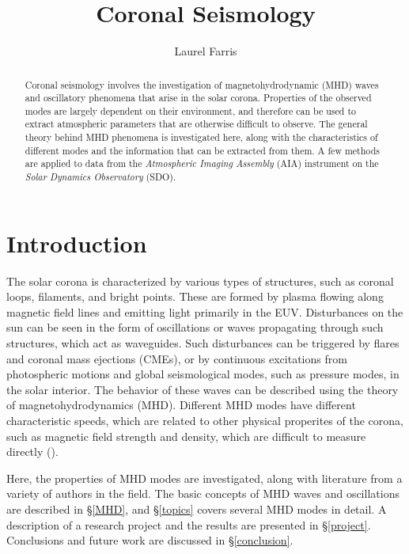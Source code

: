 \documentclass[preprint2]{aastex}
\begin{document}
\title{\vspace{-0.75in}Coronal Seismology}
\author{\vspace{-0.25in}Laurel Farris}

\begin{abstract}
Coronal seismology involves the investigation of magnetohydrodynamic
(MHD) waves and oscillatory phenomena that arise in the solar corona.
Properties of the observed modes are largely dependent on their
environment, and therefore can be used to extract atmospheric
parameters that are otherwise difficult to observe.
The general theory behind MHD phenomena is investigated here, along with
the characteristics of different modes
and the information that can be extracted from them.
A few methods are applied to data from the \emph{Atmospheric Imaging
Assembly} (AIA) instrument on the \emph{Solar Dynamics Observatory} (SDO).
\end{abstract}

\section{Introduction}\label{intro}
The solar corona is characterized by various types of structures, such
as coronal loops, filaments, and bright points. These are formed by
plasma flowing along magnetic field lines and emitting light primarily in the
EUV\@. Disturbances on the sun
can be seen in the form of oscillations or waves propagating through such
structures, which act as waveguides.
Such disturbances can be triggered by flares and
coronal mass ejections (CMEs), or by continuous excitations from
photospheric motions and global seismological modes, such as pressure modes,
in the solar interior.
The behavior of these waves can be described using the theory of
magnetohydrodynamics (MHD). Different MHD modes have different characteristic
speeds, which are related to other physical properites of the corona, such
as magnetic field strength and density, which are
difficult to measure directly (\cite{tor_2}).

Here, the properties of MHD modes are investigated, along with literature
from a variety of authors in the field.
The basic concepts of MHD waves and oscillations are described in
\S\ref{MHD}, and
\S\ref{topics} covers several MHD modes in detail.
A description of a research project and the results are presented in
\S\ref{project}.
Conclusions and future work are discussed in
\S\ref{conclusion}.
\end{document}
